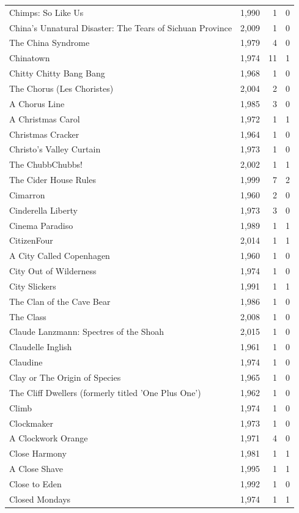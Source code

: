 \begin{tabular}{lrrr}
Chimps: So Like Us & 1,990 & 1 & 0 \\
China's Unnatural Disaster: The Tears of Sichuan Province & 2,009 & 1 & 0 \\
The China Syndrome & 1,979 & 4 & 0 \\
Chinatown & 1,974 & 11 & 1 \\
Chitty Chitty Bang Bang & 1,968 & 1 & 0 \\
The Chorus (Les Choristes) & 2,004 & 2 & 0 \\
A Chorus Line & 1,985 & 3 & 0 \\
A Christmas Carol & 1,972 & 1 & 1 \\
Christmas Cracker & 1,964 & 1 & 0 \\
Christo's Valley Curtain & 1,973 & 1 & 0 \\
The ChubbChubbs! & 2,002 & 1 & 1 \\
The Cider House Rules & 1,999 & 7 & 2 \\
Cimarron & 1,960 & 2 & 0 \\
Cinderella Liberty & 1,973 & 3 & 0 \\
Cinema Paradiso & 1,989 & 1 & 1 \\
CitizenFour & 2,014 & 1 & 1 \\
A City Called Copenhagen & 1,960 & 1 & 0 \\
City Out of Wilderness & 1,974 & 1 & 0 \\
City Slickers & 1,991 & 1 & 1 \\
The Clan of the Cave Bear & 1,986 & 1 & 0 \\
The Class & 2,008 & 1 & 0 \\
Claude Lanzmann: Spectres of the Shoah & 2,015 & 1 & 0 \\
Claudelle Inglish & 1,961 & 1 & 0 \\
Claudine & 1,974 & 1 & 0 \\
Clay or The Origin of Species & 1,965 & 1 & 0 \\
The Cliff Dwellers (formerly titled 'One Plus One') & 1,962 & 1 & 0 \\
Climb & 1,974 & 1 & 0 \\
Clockmaker & 1,973 & 1 & 0 \\
A Clockwork Orange & 1,971 & 4 & 0 \\
Close Harmony & 1,981 & 1 & 1 \\
A Close Shave & 1,995 & 1 & 1 \\
Close to Eden & 1,992 & 1 & 0 \\
Closed Mondays & 1,974 & 1 & 1 \\

\end{tabular}

